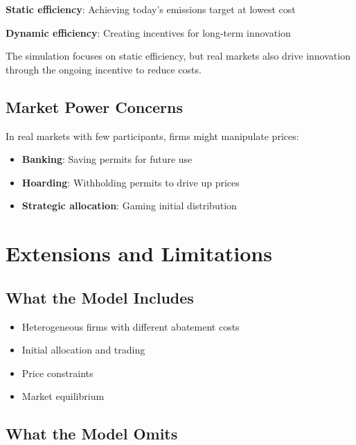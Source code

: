 \documentclass{tufte-handout}\usepackage[]{graphicx}\usepackage[]{xcolor}
\begin{document}
\textbf{Static efficiency}: Achieving today's emissions target at lowest cost

\textbf{Dynamic efficiency}: Creating incentives for long-term innovation


The simulation focuses on static efficiency, but real markets also drive innovation through the ongoing incentive to reduce costs.

\subsection{Market Power Concerns}

In real markets with few participants, firms might manipulate prices:

\begin{itemize}
\item \textbf{Banking}: Saving permits for future use
\item \textbf{Hoarding}: Withholding permits to drive up prices
\item \textbf{Strategic allocation}: Gaming initial distribution
\end{itemize}

\section{Extensions and Limitations}

\subsection{What the Model Includes}

\begin{itemize}
\item Heterogeneous firms with different abatement costs
\item Initial allocation and trading
\item Price constraints
\item Market equilibrium
\end{itemize}

\subsection{What the Model Omits}
\end{document}
